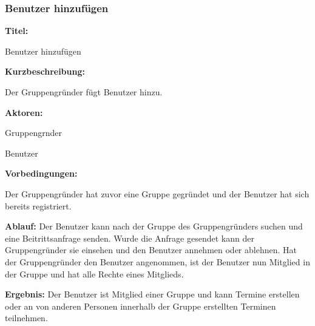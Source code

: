 \documentclass{scrartcl}
\begin{document}
	\subsubsection{Benutzer hinzufügen}
	\begin{description}
		\item \textbf{Titel:}
		\begin{description}
			\item Benutzer hinzufügen
		\end{description}
		\item \textbf{Kurzbeschreibung:}
		\begin{description}
			\item Der Gruppengründer fügt Benutzer hinzu.
		\end{description}
		\item \textbf{Aktoren:}
		\begin{description}
			\item \gls{Gruppengrnder}
			\item Benutzer
		\end{description}
		\item \textbf{Vorbedingungen:}
		\begin{description}
			\item Der Gruppengründer hat zuvor eine Gruppe gegründet und der Benutzer hat sich bereits registriert.
		\end{description}
		\item \textbf{Ablauf:} \newline Der Benutzer kann nach der Gruppe des Gruppengründers suchen und eine Beitrittsanfrage senden. Wurde die Anfrage gesendet kann der Gruppengründer sie einsehen und den Benutzer annehmen oder ablehnen. Hat der Gruppengründer den Benutzer angenommen, ist der Benutzer nun \gls{Mitglied} in der Gruppe und hat alle Rechte eines Mitglieds.
		\item \textbf{Ergebnis:} \newline Der Benutzer ist \gls{Mitglied} einer Gruppe und kann Termine erstellen oder an von anderen Personen innerhalb der Gruppe erstellten Terminen teilnehmen.
	\end{description}
	
	\newpage
	
\end{document}
